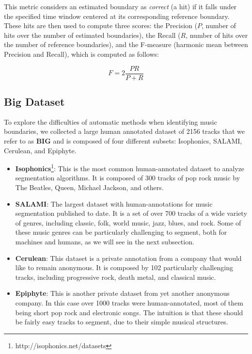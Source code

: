\documentclass{article}
\begin{document}
This metric considers an estimated boundary as \emph{correct} (a hit) if it falls under the specified time window centered at its corresponding reference boundary.
These hits are then used to compute three scores: the Precision ($P$, number of hits over the number of estimated boundaries), the Recall ($R$, number of hits over the number of reference boundaries), and the F-measure (harmonic mean between Precision and Recall), which is computed as follows:

\begin{equation}\label{eq:fmeasure}
  F = 2 \frac{P R}{P + R}
\end{equation}

\subsection{Big Dataset}

To explore the difficulties of automatic methods when identifying music boundaries, we collected a large human annotated dataset of 2156 tracks that we refer to as \textbf{BIG} and is composed of four different subsets: Isophonics, SALAMI, Cerulean, and Epiphyte.

\begin{itemize}
  \item
    \textbf{Isophonics}\footnote{http://isophonics.net/datasets}: This is the most common human-annotated dataset to analyze segmentation algorithms. 
    It is composed of 300 tracks of pop rock music by The Beatles, Queen, Michael Jackson, and others.

  \item
    \textbf{SALAMI}\cite{Smith2011}: The largest dataset with human-annotations for music segmentation published to date. 
    It is a set of over 700 tracks of a wide variety of genres, including classic, folk, world music, jazz, blues, and rock.
    Some of these music genres can be particularly challenging to segment, both for machines and humans, as we will see in the next subsection.

  \item
    \textbf{Cerulean}: This dataset is a private annotation from a company that would like to remain anonymous.
    It is composed by 102 particularly challenging tracks, including progressive rock, death metal, and classical music.

  \item
    \textbf{Epiphyte}: This is another private dataset from yet another anonymous company.
    In this case over 1000 tracks were human-annotated, most of them being short pop rock and electronic songs.
    The intuition is that these should be fairly easy tracks to segment, due to their simple musical structures.

\end{itemize}
\end{document}
